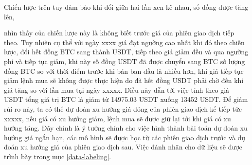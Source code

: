 Chiến lược trên tuy đảm bảo khi đổi giữa hai lần xen kẽ nhau, số đồng được tăng lên, %

nhìn thấy của chiến lược này là không biết trước giá của phiên giao dịch tiếp theo. Tuy nhiên cụ thể với ngày xxxx giá đạt ngưỡng cao nhất khi đó theo chiến lược, đổi hết đồng BTC sang thành USDT, tiếp theo giá giảm đều và qua ngưỡng phí và tiếp tục giảm, khi này số đồng USDT đã được chuyển sang BTC số lượng đồng BTC so với thời điểm trước khi bán ban đầu là nhiều hơn, khi giá tiếp tục giảm lệnh mua sẽ không được thực hiện do đã hết đồng USDT phải chờ đến khi giá tăng so với lần mua tại ngày xxxxx. Điều này dẫn tới việc tính theo giá USDT tổng giá trị BTC là giảm từ 14975.03 USDT xuống 13452 USDT. Để giảm rủi ro này, ta có thể dự đoán xu hướng giá đóng của phiên giao dịch kế tiếp tức xxxxx, nếu giá có xu hướng giảm, lệnh mua sẽ được giữ lại tới khi giá có xu hướng tăng. Đây chính là ý tưởng chính cho việc hình thành bài toán dự đoán xu hướng giá ngắn hạn, các mô hình sẽ được học từ các phiên giao dịch trước và dự đoán xu hướng giá của phiên giao dịch sau. Việc đánh nhãn cho dữ liệu sẽ được trình bày trong mục \ref{data-labeling}.
 
 
